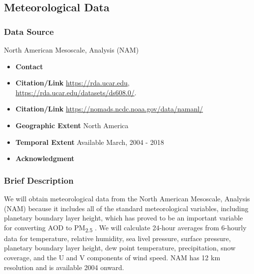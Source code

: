 \subsection{Meteorological Data}
\subsubsection*{Data Source} North American Mesoscale, Analysis (NAM)
\begin{itemize}[nolistsep]
\item \textbf{Contact} %
\item \textbf{Citation/Link}  \url{https://rda.ucar.edu}, \url{https://rda.ucar.edu/datasets/ds608.0/}.
\item \textbf{Citation/Link}  \url{https://nomads.ncdc.noaa.gov/data/namanl/}
\item \textbf{Geographic Extent} North America
\item \textbf{Temporal Extent} Available March, 2004 - 2018
\item \textbf{Acknowledgment}
\end{itemize}
\subsubsection*{Brief Description}


We will obtain meteorological data from the North American Mesoscale, Analysis (NAM) because it includes all of the standard meteorological variables, including planetary boundary layer height, which has proved to be an important variable for converting AOD to PM\textsubscript{2.5} \citep{liu_estimating_2005}. We will calculate 24-hour averages from 6-hourly data for temperature, relative humidity, sea livel pressure, surface pressure, planetary boundary layer height, dew point temperature, precipitation, snow coverage, and the U and V components of wind speed. NAM has 12 km resolution and is available 2004 onward.


